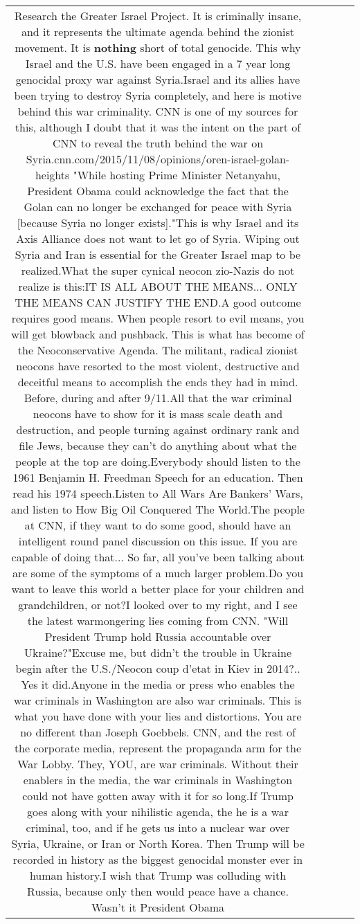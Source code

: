 \documentclass[11pt]{article}
\newlength\mylength
\begin{document}
\begin{center}
\begin{longtable}{|C{.65\mylength}|C{.30\mylength}|C{.12\mylength}|C{.12\mylength}|C{.12\mylength}|}
  \small Research the Greater Israel Project. It is criminally insane, and it represents the ultimate agenda behind the zionist movement. It is \textbf{nothing} short of total genocide. This why Israel and the U.S. have been engaged in a 7 year long genocidal proxy war against Syria.Israel and its allies have been trying to destroy Syria completely, and here is motive behind this war criminality. CNN is one of my sources for this, although I doubt that it was the intent on the part of CNN to reveal the truth behind the war on Syria.cnn.com/2015/11/08/opinions/oren-israel-golan-heights "While hosting Prime Minister Netanyahu, President Obama could acknowledge the fact that the Golan can no longer be exchanged for peace with Syria [because Syria no longer exists]."This is why Israel and its Axis Alliance does not want to let go of Syria. Wiping out Syria and Iran is essential for the Greater Israel map to be realized.What the super cynical neocon zio-Nazis do not realize is this:IT IS ALL ABOUT THE MEANS... ONLY THE MEANS CAN JUSTIFY THE END.A good outcome requires good means. When people resort to evil means, you will get blowback and pushback. This is what has become of the Neoconservative Agenda. The militant, radical zionist neocons have resorted to the most violent, destructive and deceitful means to accomplish the ends they had in mind. Before, during and after 9/11.All that the war criminal neocons have to show for it is mass scale death and destruction, and people turning against ordinary rank and file Jews, because they can't do anything about what the people at the top are doing.Everybody should listen to the 1961 Benjamin H. Freedman Speech for an education. Then read his 1974 speech.Listen to All Wars Are Bankers' Wars, and listen to How Big Oil Conquered The World.The people at CNN, if they want to do some good, should have an intelligent round panel discussion on this issue. If you are capable of doing that... So far, all you've been talking about are some of the symptoms of a much larger problem.Do you want to leave this world a better place for your children and grandchildren, or not?I looked over to my right, and I see the latest warmongering lies coming from CNN. "Will President Trump hold Russia accountable over Ukraine?"Excuse me, but didn't the trouble in Ukraine begin after the U.S./Neocon coup d'etat in Kiev in 2014?.. Yes it did.Anyone in the media or press who enables the war criminals in Washington are also war criminals. This is what you have done with your lies and distortions. You are no different than Joseph Goebbels. CNN, and the rest of the corporate media, represent the propaganda arm for the War Lobby. They, YOU, are war criminals. Without their enablers in the media, the war criminals in Washington could not have gotten away with it for so long.If Trump goes along with your nihilistic agenda, the he is a war criminal, too, and if he gets us into a nuclear war over Syria, Ukraine, or Iran or North Korea. Then Trump will be recorded in history as the biggest genocidal monster ever in human history.I wish that Trump was colluding with Russia, because only then would peace have a chance. Wasn't it President Obama 
\end{longtable}
\end{center}
\end{document}
